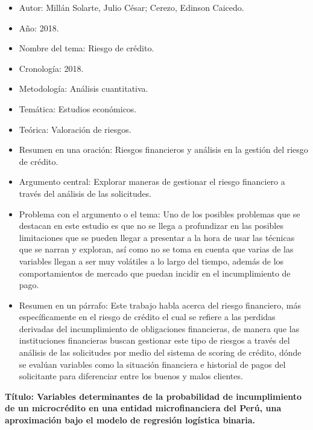 \documentclass[
  letterpaper,
  DIV=11,
  numbers=noendperiod]{scrreprt}
\begin{document}
\begin{itemize}
\item
  Autor: Millán Solarte, Julio César; Cerezo, Edinson Caicedo.
\item
  Año: 2018.
\item
  Nombre del tema: Riesgo de crédito.
\item
  Cronología: 2018.
\item
  Metodología: Análisis cuantitativa.
\item
  Temática: Estudios económicos.
\item
  Teórica: Valoración de riesgos.
\item
  Resumen en una oración: Riesgos financieros y análisis en la gestión
  del riesgo de crédito.
\item
  Argumento central: Explorar maneras de gestionar el riesgo financiero
  a través del análisis de las solicitudes.
\item
  Problema con el argumento o el tema: Uno de los posibles problemas que
  se destacan en este estudio es que no se llega a profundizar en las
  posibles limitaciones que se pueden llegar a presentar a la hora de
  usar las técnicas que se narran y exploran, así como no se toma en
  cuenta que varias de las variables llegan a ser muy volátiles a lo
  largo del tiempo, además de los comportamientos de mercado que puedan
  incidir en el incumplimiento de pago.
\item
  Resumen en un párrafo: Este trabajo habla acerca del riesgo
  financiero, más específicamente en el riesgo de crédito el cual se
  refiere a las perdidas derivadas del incumplimiento de obligaciones
  financieras, de manera que las instituciones financieras buscan
  gestionar este tipo de riesgos a través del análisis de las
  solicitudes por medio del sistema de scoring de crédito, dónde se
  evalúan variables como la situación financiera e historial de pagos
  del solicitante para diferenciar entre los buenos y malos clientes.
\end{itemize}

\textbf{Título: Variables determinantes de la probabilidad de
incumplimiento de un microcrédito en una entidad microfinanciera del
Perú, una aproximación bajo el modelo de regresión logística binaria. }
\end{document}
